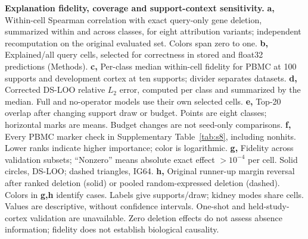 \textbf{Explanation fidelity, coverage and support-context sensitivity.}
\textbf{a,} Within-cell Spearman correlation with exact query-only gene deletion, summarized within and across classes, for eight attribution variants; independent recomputation on the original evaluated set. Colors span zero to one.
\textbf{b,} Explained/all query cells, selected for correctness in stored and float32 predictions (Methods).
\textbf{c,} Per-class median within-cell fidelity for PBMC at 100 supports and development cortex at ten supports; divider separates datasets.
\textbf{d,} Corrected DS-LOO relative $L_2$ error, computed per class and summarized by the median. Full and no-operator models use their own selected cells.
\textbf{e,} Top-20 overlap after changing support draw or budget. Points are eight classes; horizontal marks are means. Budget changes are not seed-only comparisons.
\textbf{f,} Every PBMC marker check in Supplementary Table~\ref{tab:s8}, including nonhits. Lower ranks indicate higher importance; color is logarithmic.
\textbf{g,} Fidelity across validation subsets; ``Nonzero'' means absolute exact effect $>10^{-4}$ per cell. Solid circles, DS-LOO; dashed triangles, IG64.
\textbf{h,} Original runner-up margin reversal after ranked deletion (solid) or pooled random-expressed deletion (dashed). Colors in \textbf{g,h} identify cases.
Labels give supports/draw; kidney modes share cells. Values are descriptive, without confidence intervals. One-shot and held-study-cortex validation are unavailable. Zero deletion effects do not assess absence information; fidelity does not establish biological causality.
